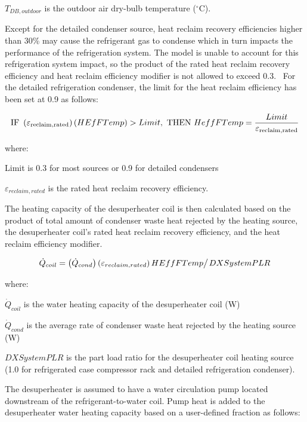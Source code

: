 \({T_{DB,outdoor}}\) is the outdoor air dry-bulb temperature (\(^{\circ}\)C).

Except for the detailed condenser source, heat reclaim recovery efficiencies higher than 30\% may cause the refrigerant gas to condense which in turn impacts the performance of the refrigeration system. The model is unable to account for this refrigeration system impact, so the product of the rated heat reclaim recovery efficiency and heat reclaim efficiency modifier is not allowed to exceed 0.3.~ For the detailed refrigeration condenser, the limit for the heat reclaim efficiency has been set at 0.9 as follows:

\begin{equation}
{\rm{IF~}}\left( {{\varepsilon_{{\rm{reclaim,rated}}}}} \right)\left( {HEfFTemp} \right) > Limit,{\rm{~THEN~}}HeffFTemp = \frac{{Limit}}{{{\varepsilon_{{\rm{reclaim,rated}}}}}}
\end{equation}

where:

Limit is 0.3 for most sources or 0.9 for detailed condensers

\({\varepsilon_{reclaim,rated}}\) is the rated heat reclaim recovery efficiency.

The heating capacity of the desuperheater coil is then calculated based on the product of total amount of condenser waste heat rejected by the heating source, the desuperheater coil's rated heat reclaim recovery efficiency, and the heat reclaim efficiency modifier.

\begin{equation}
{\dot Q_{coil}} = {{\left( {{{\dot Q}_{cond}}} \right)\left( {{\varepsilon_{reclaim,rated}}} \right)HEffFTemp} \mathord{\left/ {\vphantom {{\left( {{{\dot Q}_{cond}}} \right)\left( {{\varepsilon_{reclaim,rated}}} \right)HEffFTemp} {DXSystemPLR}}} \right. } {DXSystemPLR}}
\end{equation}

where:

\({\dot Q_{coil}}\) is the water heating capacity of the desuperheater coil (W)

\({\dot Q_{cond}}\) is the average rate of condenser waste heat rejected by the heating source (W)

\(DXSystemPLR\) is the part load ratio for the desuperheater coil heating source (1.0 for refrigerated case compressor rack and detailed refrigeration condenser).

The desuperheater is assumed to have a water circulation pump located downstream of the refrigerant-to-water coil. Pump heat is added to the desuperheater water heating capacity based on a user-defined fraction as follows:

